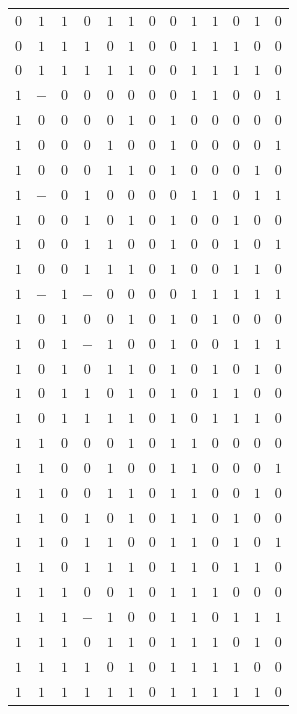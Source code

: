 \documentclass [15pt,a4paper,twoside]{article}
\begin{document}
\begin{center}
\begin{tabular}{cccccc|ccccccc}
$0$&$1$&$1$&$0$&$1$&$1$&$0$&$0$&$1$&$1$&$0$&$1$&$0$\\
$0$&$1$&$1$&$1$&$0$&$1$&$0$&$0$&$1$&$1$&$1$&$0$&$0$\\
$0$&$1$&$1$&$1$&$1$&$1$&$0$&$0$&$1$&$1$&$1$&$1$&$0$\\
$1$&$-$&$0$&$0$&$0$&$0$&$0$&$0$&$1$&$1$&$0$&$0$&$1$\\
$1$&$0$&$0$&$0$&$0$&$1$&$0$&$1$&$0$&$0$&$0$&$0$&$0$\\
$1$&$0$&$0$&$0$&$1$&$0$&$0$&$1$&$0$&$0$&$0$&$0$&$1$\\
$1$&$0$&$0$&$0$&$1$&$1$&$0$&$1$&$0$&$0$&$0$&$1$&$0$\\
$1$&$-$&$0$&$1$&$0$&$0$&$0$&$0$&$1$&$1$&$0$&$1$&$1$\\
$1$&$0$&$0$&$1$&$0$&$1$&$0$&$1$&$0$&$0$&$1$&$0$&$0$\\
$1$&$0$&$0$&$1$&$1$&$0$&$0$&$1$&$0$&$0$&$1$&$0$&$1$\\
$1$&$0$&$0$&$1$&$1$&$1$&$0$&$1$&$0$&$0$&$1$&$1$&$0$\\
$1$&$-$&$1$&$-$&$0$&$0$&$0$&$0$&$1$&$1$&$1$&$1$&$1$\\
$1$&$0$&$1$&$0$&$0$&$1$&$0$&$1$&$0$&$1$&$0$&$0$&$0$\\
$1$&$0$&$1$&$-$&$1$&$0$&$0$&$1$&$0$&$0$&$1$&$1$&$1$\\
$1$&$0$&$1$&$0$&$1$&$1$&$0$&$1$&$0$&$1$&$0$&$1$&$0$\\
$1$&$0$&$1$&$1$&$0$&$1$&$0$&$1$&$0$&$1$&$1$&$0$&$0$\\
$1$&$0$&$1$&$1$&$1$&$1$&$0$&$1$&$0$&$1$&$1$&$1$&$0$\\
$1$&$1$&$0$&$0$&$0$&$1$&$0$&$1$&$1$&$0$&$0$&$0$&$0$\\
$1$&$1$&$0$&$0$&$1$&$0$&$0$&$1$&$1$&$0$&$0$&$0$&$1$\\
$1$&$1$&$0$&$0$&$1$&$1$&$0$&$1$&$1$&$0$&$0$&$1$&$0$\\
$1$&$1$&$0$&$1$&$0$&$1$&$0$&$1$&$1$&$0$&$1$&$0$&$0$\\
$1$&$1$&$0$&$1$&$1$&$0$&$0$&$1$&$1$&$0$&$1$&$0$&$1$\\
$1$&$1$&$0$&$1$&$1$&$1$&$0$&$1$&$1$&$0$&$1$&$1$&$0$\\
$1$&$1$&$1$&$0$&$0$&$1$&$0$&$1$&$1$&$1$&$0$&$0$&$0$\\
$1$&$1$&$1$&$-$&$1$&$0$&$0$&$1$&$1$&$0$&$1$&$1$&$1$\\
$1$&$1$&$1$&$0$&$1$&$1$&$0$&$1$&$1$&$1$&$0$&$1$&$0$\\
$1$&$1$&$1$&$1$&$0$&$1$&$0$&$1$&$1$&$1$&$1$&$0$&$0$\\
$1$&$1$&$1$&$1$&$1$&$1$&$0$&$1$&$1$&$1$&$1$&$1$&$0$\\

\end{tabular}
\end{center}
\end{document}
